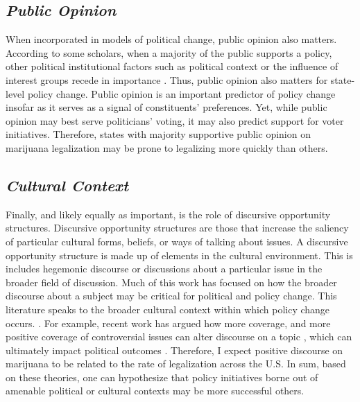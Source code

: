 \subsection{\it{Public Opinion}}

When incorporated in models of political change, public opinion also matters. According to some scholars, when a majority of the public supports a policy, other political institutional factors such as political context or the influence of interest groups recede in importance \citep{burstein_and_linton_2002,burstein_and_hirsch_2007}. Thus, public opinion also matters for state-level policy change. Public opinion is an important predictor of policy change insofar as it serves as a signal of constituents' preferences. Yet, while public opinion may best serve politicians' voting, it may also predict support for voter initiatives. Therefore, states with majority supportive public opinion on marijuana legalization may be prone to legalizing more quickly than others.







\subsection{\it{Cultural Context}}


Finally, and likely equally as important, is the role of discursive opportunity structures. Discursive opportunity structures are those that increase the saliency of particular cultural forms, beliefs, or ways of talking about issues. A discursive opportunity structure is made up of elements in the cultural environment. This is includes hegemonic discourse or discussions about a particular issue in the broader field of discussion. Much of this work has focused on how the broader discourse about a subject may be critical for political and policy change. This literature speaks to the broader cultural context within which policy change occurs. \citep{mccammon_et_al_2007,mccammon_et_al_2001}. For example, recent work has argued how more coverage, and more positive coverage of controversial issues \citep{amenta_et_al_2019,amenta_et_al_2009} can alter discourse on a topic \citep{bail_2012,ghaziani_and_baldassarri_2011}, which can ultimately impact political outcomes \citep{vasi_et_al_2015}. Therefore, I expect positive discourse on marijuana to be related to the rate of legalization across the U.S. In sum, based on these theories, one can hypothesize that policy initiatives borne out of amenable political or cultural contexts may be more successful others. 



